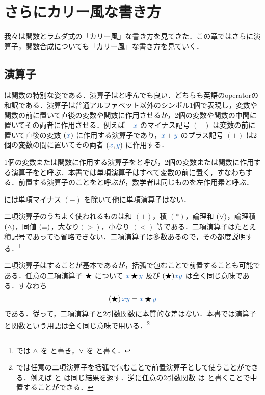 \documentclass[a5paper,twoside,fleqn,draft]{jsbook}
\begin{document}
\chapter{さらにカリー風な書き方}
\label{ch:more-curry}

\begin{leader}
我々は関数とラムダ式の「カリー風」な書き方を見てきた．この章ではさらに演算子，関数合成についても「カリー風」な書き方を見ていく．
\end{leader}

\section{演算子}

は関数の特別な姿である．演算子はと呼んでも良い．どちらも英語のoperatorの和訳である．演算子は普通アルファベット以外のシンボル1個で表現し，変数や関数の前に置いて直後の変数や関数に作用させるか，2個の変数や関数の中間に置いてその両者に作用させる．例えば $-\hVar{x}$ のマイナス記号 $(-)$ は変数の前に置いて直後の変数 $(\hVar{x})$ に作用する演算子であり，$\hVar{x}+\hVar{y}$ のプラス記号 $(+)$ は2個の変数の間に置いてその両者 $(\hVar{x},\hVar{y})$ に作用する．

1個の変数または関数に作用する演算子をと呼び，2個の変数または関数に作用する演算子をと呼ぶ．本書では単項演算子はすべて変数の前に置く，すなわちする．前置する演算子のことをと呼ぶが，数学者は同じものを左作用素と呼ぶ．

\haskell には単項マイナス $(-)$ を除いて他に単項演算子はない．

\separator

二項演算子のうちよく使われるものは和 $(+)$，積 $(*)$，論理和 $(\operatorname{\vee})$，論理積 $(\operatorname{\wedge})$，同値 $(\operatorname{\equiv})$，大なり$(>)$，小なり $(<)$ 等である．二項演算子はたとえ積記号であっても省略できない．二項演算子は多数あるので，その都度説明する．\footnote{\haskell では $\operatorname{\wedge}$ を \code{\&\&} と書き，$\operatorname{\vee}$ を \code{||} と書く．}

二項演算子はすることが基本であるが，括弧で包むことで前置することも可能である．任意の二項演算子 $\operatorname{\bigstar}$ について $\hVar{x}\hAnyBinOp\hVar{y}$ 及び $(\hAnyBinOp)\hVar{x}\hVar{y}$ は全く同じ意味である．すなわち
\begin{equation}
  \left(\hAnyBinOp\right)\hVar{x}\hVar{y}
  =\hVar{x}\hAnyBinOp\hVar{y}
\end{equation}
である．従って，二項演算子と2引数関数に本質的な差はない．本書では演算子と関数という用語は全く同じ意味で用いる．\footnote{\haskell では任意の二項演算子を括弧で包むことで前置演算子として使うことができる．例えば と  は同じ結果を返す．逆に任意の2引数関数 は  と書くことで中置することができる．}
\end{document}
